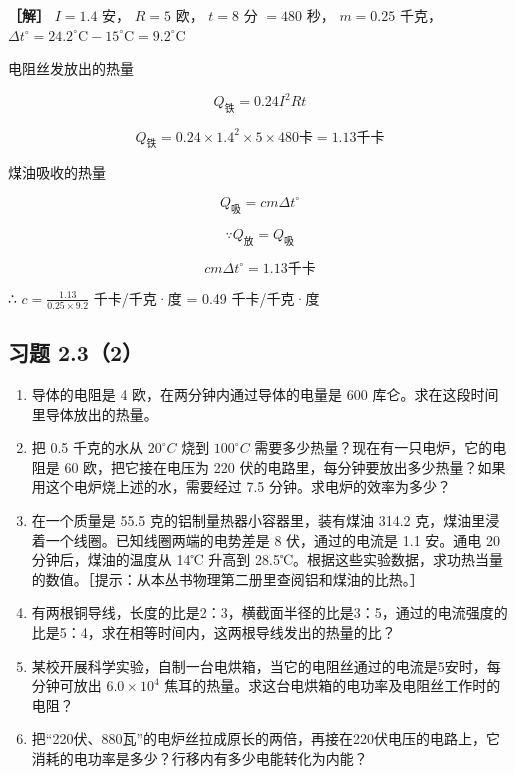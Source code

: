 \textbf{［解］} \(I = 1.4\) 安， \(R = 5\) 欧， \(t = 8\) 分 \(= 480\)
秒， \(m = 0.25\) 千克，
\(\Delta t^{\circ} = 24.2^{\circ}\mathrm{C} - 15^{\circ}\mathrm{C} = 9.2^{\circ}\mathrm{C}\)

电阻丝发放出的热量

\[
Q_{\mathrm{铁}} = 0.24 I^{2} R t
\]

\[
Q_{\mathrm{铁}} = 0.24 \times 1.4^{2} \times 5 \times 480 \text{卡} = 1.13 \text{千卡}
\]

煤油吸收的热量

\[
Q_{\text{吸}} = c m \Delta t^{\circ}
\]

\[
\because Q_{\text{放}} = Q_{\text{吸}}
\]

\[
c m \Delta t^{\circ} = 1.13 \text{千卡}
\]

∴ \(c=\frac{1.13}{0.25\times9.2}\) 千卡/千克·度 = 0.49 千卡/千克·度

\subsection{习题 2.3（2）}\label{ux4e60ux9898-2.32}

\begin{enumerate}
\def\labelenumi{\arabic{enumi}.}
\item
  导体的电阻是 4 欧，在两分钟内通过导体的电量是 600
  库仑。求在这段时间里导体放出的热量。
\item
  把 0.5 千克的水从 \(20^{\circ}C\) 烧到 \(100^{\circ}C\)
  需要多少热量？现在有一只电炉，它的电阻是 60 欧，把它接在电压为 220
  伏的电路里，每分钟要放出多少热量？如果用这个电炉烧上述的水，需要经过
  7.5 分钟。求电炉的效率为多少？
\item
  在一个质量是 55.5 克的铝制量热器小容器里，装有煤油 314.2
  克，煤油里浸着一个线圈。已知线圈两端的电势差是 8 伏，通过的电流是 1.1
  安。通电 20 分钟后，煤油的温度从 14℃ 升高到
  28.5℃。根据这些实验数据，求功热当量的数值。［提示：从本丛书物理第二册里查阅铝和煤油的比热。］
\item
  有两根铜导线，长度的比是2：3，横截面半径的比是3：5，通过的电流强度的比是5：4，求在相等时间内，这两根导线发出的热量的比？
\item
  某校开展科学实验，自制一台电烘箱，当它的电阻丝通过的电流是5安时，每分钟可放出
  \(6.0\times10^{4}\)
  焦耳的热量。求这台电烘箱的电功率及电阻丝工作时的电阻？
\item
  把``220伏、880瓦''的电炉丝拉成原长的两倍，再接在220伏电压的电路上，它消耗的电功率是多少？行移内有多少电能转化为内能？
\end{enumerate}

